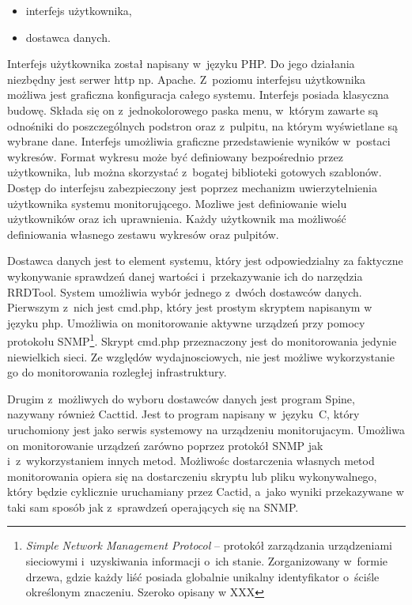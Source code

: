 \begin{itemize}
\item interfejs użytkownika,
\item dostawca danych.
\end{itemize}

Interfejs użytkownika został napisany w~języku PHP. Do jego działania
niezbędny jest serwer http np. Apache. Z~poziomu interfejsu
użytkownika możliwa jest graficzna konfiguracja całego
systemu. Interfejs posiada klasyczna budowę. Składa się on
z~jednokolorowego paska menu, w~którym zawarte są odnośniki do
poszczególnych podstron oraz z~pulpitu, na którym wyświetlane są
wybrane dane. Interfejs umożliwia graficzne przedstawienie wyników
w~postaci wykresów. Format wykresu może być definiowany bezpośrednio
przez użytkownika, lub można skorzystać z~bogatej biblioteki gotowych
szablonów. Dostęp do interfejsu zabezpieczony jest poprzez mechanizm
uwierzytelnienia użytkownika systemu monitorującego. Mozliwe jest
definiowanie wielu użytkowników oraz ich uprawnienia. Każdy użytkownik
ma możliwość definiowania własnego zestawu wykresów oraz pulpitów.

Dostawca danych jest to element systemu, który jest odpowiedzialny za
faktyczne wykonywanie sprawdzeń danej wartości i~przekazywanie ich do
narzędzia RRDTool. System umożliwia wybór jednego z~dwóch dostawców
danych. Pierwszym z~nich jest cmd.php, który jest prostym skryptem
napisanym w języku php. Umożliwia on monitorowanie aktywne urządzeń
przy pomocy protokołu SNMP\footnote{ {\em Simple Network Management
    Protocol} -- protokół zarządzania urządzeniami sieciowymi
  i~uzyskiwania informacji o~ich stanie. Zorganizowany w~formie
  drzewa, gdzie każdy liść posiada globalnie unikalny identyfikator
  o~ściśle określonym znaczeniu. Szeroko opisany w XXX}. Skrypt
cmd.php przeznaczony jest do monitorowania jedynie niewielkich
sieci. Ze względów wydajnosciowych, nie jest możliwe wykorzystanie go
do monitorowania rozległej infrastruktury.

Drugim z~możliwych do wyboru dostawców danych jest program Spine,
nazywany również Cacttid. Jest to program napisany w~języku~C, który
uruchomiony jest jako serwis systemowy na urządzeniu
monitorujacym. Umożliwa on monitorowanie urządzeń zarówno poprzez
protokół SNMP jak i~z~wykorzystaniem innych metod. Możliwośc
dostarczenia własnych metod monitorowania opiera się na dostarczeniu
skryptu lub pliku wykonywalnego, który będzie cyklicznie uruchamiany
przez Cactid, a~jako wyniki przekazywane w taki sam sposób jak
z~sprawdzeń operających się na SNMP.

